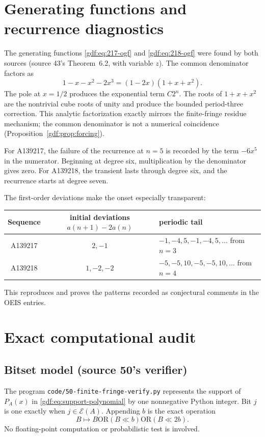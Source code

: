 \documentclass[11pt,a4paper]{article}
\numberwithin{equation}{section}
\theoremstyle{definition}
\theoremstyle{remark}
\theoremstyle{plain}
\newcommand{\cE}{\mathcal E}
\newcommand{\file}[1]{\nolinkurl{#1}}
\begin{document}
\section{Generating functions and recurrence diagnostics}\label{gdf:sec:gf}

The generating functions \eqref{gdf:eq:217-ogf} and \eqref{gdf:eq:218-ogf}
were found by both sources (source 43's Theorem~6.2, with variable $z$).
The common denominator factors as
\begin{equation}\label{gdf:eq:den-factor}
 1-x-x^2-2x^3=(1-2x)(1+x+x^2).
\end{equation}
The pole at $x=1/2$ produces the exponential term $C2^n$.  The roots of
$1+x+x^2$ are the nontrivial cube roots of unity and produce the bounded
period-three correction.  This analytic factorization exactly mirrors the
finite-fringe residue mechanism; the common denominator is not a numerical
coincidence (Proposition~\ref{gdf:prop:forcing}).

For A139217, the failure of the recurrence at $n=5$ is recorded by the term
$-6x^5$ in the numerator.  Beginning at degree six, multiplication by the
denominator gives zero.  For A139218, the transient lasts through degree six,
and the recurrence starts at degree seven.

The first-order deviations make the onset especially transparent:
\begin{center}
\begin{tabular}{ccl}
\toprule
Sequence & initial deviations $a(n+1)-2a(n)$ & periodic tail\\
\midrule
A139217 & $2,-1$ & $-1,-4,5,-1,-4,5,\dots$ from $n=3$\\
A139218 & $1,-2,-2$ & $-5,-5,10,-5,-5,10,\dots$ from $n=4$\\
\bottomrule
\end{tabular}
\end{center}
This reproduces and proves the patterns recorded as conjectural comments in
the OEIS entries.

\section{Exact computational audit}\label{gdf:sec:audit}

\subsection{Bitset model (source 50's verifier)}

The program \file{code/50-finite-fringe-verify.py} represents the support
of $P_A(x)$ in
\eqref{gdf:eq:support-polynomial} by one nonnegative Python integer.  Bit $j$ is
one exactly when $j\in\cE(A)$.  Appending $b$ is the exact operation
\begin{equation}\label{gdf:eq:bitset-update}
 B\longmapsto B\mathbin{\mathrm{OR}}(B\ll b)
                  \mathbin{\mathrm{OR}}(B\ll2b).
\end{equation}
No floating-point computation or probabilistic test is involved.
\end{document}
